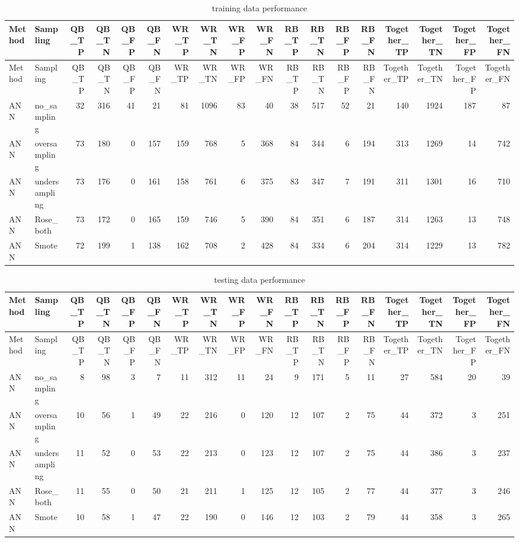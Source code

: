 \documentclass[]{article}
\begin{document}
\begin{longtable}[]{@{}llrrrrrrrrrrrrrrrr@{}}
\caption{training data performance}\tabularnewline
\toprule
Method & Sampling & QB\_TP & QB\_TN & QB\_FP & QB\_FN & WR\_TP & WR\_TN
& WR\_FP & WR\_FN & RB\_TP & RB\_TN & RB\_FP & RB\_FN & Together\_TP &
Together\_TN & Together\_FP & Together\_FN\tabularnewline
\midrule
\endfirsthead
\toprule
Method & Sampling & QB\_TP & QB\_TN & QB\_FP & QB\_FN & WR\_TP & WR\_TN
& WR\_FP & WR\_FN & RB\_TP & RB\_TN & RB\_FP & RB\_FN & Together\_TP &
Together\_TN & Together\_FP & Together\_FN\tabularnewline
\midrule
\endhead
ANN & no\_sampling & 32 & 316 & 41 & 21 & 81 & 1096 & 83 & 40 & 38 & 517
& 52 & 21 & 140 & 1924 & 187 & 87\tabularnewline
ANN & oversampling & 73 & 180 & 0 & 157 & 159 & 768 & 5 & 368 & 84 & 344
& 6 & 194 & 313 & 1269 & 14 & 742\tabularnewline
ANN & undersampling & 73 & 176 & 0 & 161 & 158 & 761 & 6 & 375 & 83 &
347 & 7 & 191 & 311 & 1301 & 16 & 710\tabularnewline
ANN & Rose\_both & 73 & 172 & 0 & 165 & 159 & 746 & 5 & 390 & 84 & 351 &
6 & 187 & 314 & 1263 & 13 & 748\tabularnewline
ANN & Smote & 72 & 199 & 1 & 138 & 162 & 708 & 2 & 428 & 84 & 334 & 6 &
204 & 314 & 1229 & 13 & 782\tabularnewline
\bottomrule
\end{longtable}

\begin{longtable}[]{@{}llrrrrrrrrrrrrrrrr@{}}
\caption{testing data performance}\tabularnewline
\toprule
Method & Sampling & QB\_TP & QB\_TN & QB\_FP & QB\_FN & WR\_TP & WR\_TN
& WR\_FP & WR\_FN & RB\_TP & RB\_TN & RB\_FP & RB\_FN & Together\_TP &
Together\_TN & Together\_FP & Together\_FN\tabularnewline
\midrule
\endfirsthead
\toprule
Method & Sampling & QB\_TP & QB\_TN & QB\_FP & QB\_FN & WR\_TP & WR\_TN
& WR\_FP & WR\_FN & RB\_TP & RB\_TN & RB\_FP & RB\_FN & Together\_TP &
Together\_TN & Together\_FP & Together\_FN\tabularnewline
\midrule
\endhead
ANN & no\_sampling & 8 & 98 & 3 & 7 & 11 & 312 & 11 & 24 & 9 & 171 & 5 &
11 & 27 & 584 & 20 & 39\tabularnewline
ANN & oversampling & 10 & 56 & 1 & 49 & 22 & 216 & 0 & 120 & 12 & 107 &
2 & 75 & 44 & 372 & 3 & 251\tabularnewline
ANN & undersampling & 11 & 52 & 0 & 53 & 22 & 213 & 0 & 123 & 12 & 107 &
2 & 75 & 44 & 386 & 3 & 237\tabularnewline
ANN & Rose\_both & 11 & 55 & 0 & 50 & 21 & 211 & 1 & 125 & 12 & 105 & 2
& 77 & 44 & 377 & 3 & 246\tabularnewline
ANN & Smote & 10 & 58 & 1 & 47 & 22 & 190 & 0 & 146 & 12 & 103 & 2 & 79
& 44 & 358 & 3 & 265\tabularnewline
\bottomrule
\end{longtable}
\end{document}
